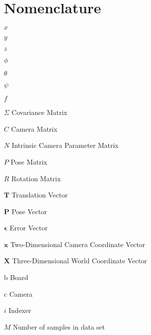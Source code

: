 \chapter{Nomenclature}

\begin{Nomencl}[2cm]

   \item[$x$]         
   \item[$y$]         
   \item[$z$]         
   \item[$\phi$]      
   \item[$\theta$]    
   \item[$\psi$]      \\
   \item[$f$]	      

   \item[$\Sigma$] 	Covariance Matrix
   \item[$C$]		Camera Matrix
   \item[$N$]		Intrinsic Camera Parameter Matrix
   \item[$P$]		Pose Matrix
   \item[$R$]		Rotation Matrix
   \item[$\bm{T}$]	Translation Vector
   \item[$\bm{P}$]	Pose Vector
   \item[$\bm{\epsilon}$]	Error Vector
   \item[$\bm{x}$]	Two-Dimensional Camera Coordinate Vector
   \item[$\bm{X}$]	Three-Dimensional World Coordinate Vector

   \item[$\mathrm{b}$]          Board
   \item[$\mathrm{c}$] 		Camera
   \item[$i$]			Indexer
   \item[$M$]			Number of samples in data set


\end{Nomencl}
